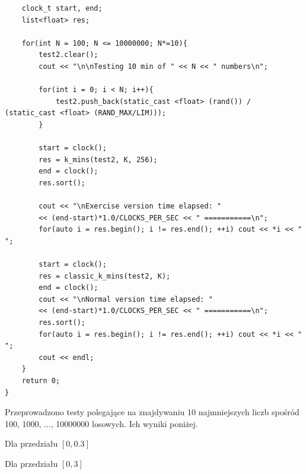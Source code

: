 \begin{verbatim}
	clock_t start, end;
	list<float> res;

	for(int N = 100; N <= 10000000; N*=10){
		test2.clear();
		cout << "\n\nTesting 10 min of " << N << " numbers\n";

		for(int i = 0; i < N; i++){
			test2.push_back(static_cast <float> (rand()) / (static_cast <float> (RAND_MAX/LIM)));
		}

		start = clock();
		res = k_mins(test2, K, 256);
		end = clock();
		res.sort();

		cout << "\nExercise version time elapsed: " 
		<< (end-start)*1.0/CLOCKS_PER_SEC << " ===========\n";
		for(auto i = res.begin(); i != res.end(); ++i) cout << *i << " ";

		start = clock();
		res = classic_k_mins(test2, K);
		end = clock();
		cout << "\nNormal version time elapsed: " 
		<< (end-start)*1.0/CLOCKS_PER_SEC << " ===========\n";
		res.sort();
		for(auto i = res.begin(); i != res.end(); ++i) cout << *i << " ";
		cout << endl;
	}
	return 0;
}
\end{verbatim}

Przeprowadzono testy polegające na znajdywaniu 10 najmniejszych liczb spośród 100, 1000, ..., 10000000 losowych.
Ich wyniki poniżej.

Dla przedziału $[0, 0.3]$



Dla przedziału $[0, 3]$
